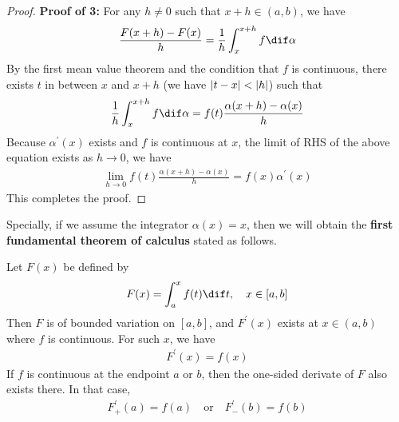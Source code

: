 \documentclass[thmcnt=section, color=blue, 12pt]{my-elegantbook}
\begin{document}
\begin{proof}
	\noindent\textbf{Proof of 3:}
	For any $h \neq 0$ such that $x+h \in (a, b)$, we have
	\begin{align*}
		\frac{F(x+h) - F(x)}{h}
		= \frac{1}{h} \int_{x}^{x+h} f \dif \alpha
	\end{align*}
	By the first mean value theorem and the condition that $f$ is continuous,
	there exists $t$ in between $x$ and $x+h$
	(we have $\left\lvert t - x \right\rvert < \left\lvert h \right\rvert$) such that
	\begin{align*}
		\frac{1}{h} \int_{x}^{x+h} f \dif \alpha
		= f(t) \frac{\alpha(x+h) - \alpha(x)}{h}
	\end{align*}
	Because $\alpha^\prime(x)$ exists and $f$ is continuous at $x$,
	the limit of RHS of the above equation exists as $h \to 0$,
	we have
	\begin{align*}
		\lim_{h \to 0} f(t) \frac{\alpha(x+h) - \alpha(x)}{h}
		= f(x) \alpha^\prime(x)
	\end{align*}
	This completes the proof.
\end{proof}

Specially, if we assume the integrator $\alpha(x) = x$,
then we will obtain the
\textbf{first fundamental theorem of calculus}
stated as follows.


\begin{theorem} \label{thm:25}
	Let $F(x)$ be defined by
	\begin{align*}
		F(x) = \int_a^x f(t) \dif t, \quad
		x \in [a, b]
	\end{align*}
	Then $F$ is of bounded variation on $[a, b]$,
	and $F^\prime(x)$ exists at $x \in (a, b)$
	where $f$ is continuous.
	For such $x$, we have
	\begin{align*}
		F^\prime(x) = f(x)
	\end{align*}
	If $f$ is continuous at the endpoint $a$ or $b$,
	then the one-sided derivate of $F$ also exists there.
	In that case,
	\begin{align*}
		F^\prime_+(a) = f(a)
		\quad \text{or} \quad
		F^\prime_{-} (b) = f(b)
	\end{align*}
\end{theorem}
\end{document}
